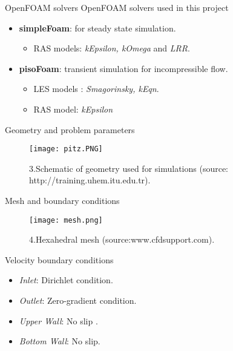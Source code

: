 \documentclass [xcolor=svgnames, t] {beamer}
\begin{document}
\begin{frame}{OpenFOAM solvers }
   OpenFOAM solvers used in this project
   \vspace{1cm}
   \begin{itemize}
       \item \textbf{simpleFoam\autocite{chapter6}}: for steady state simulation.
       \begin{itemize}
           \item RAS models: \textit{kEpsilon, kOmega} and \textit{LRR}.
       \end{itemize}
       \item \textbf{pisoFoam\autocite{chapter7}}:  transient simulation for incompressible flow.
       \begin{itemize}
          
           \item LES models : \textit{Smagorinsky,
          kEqn}.
          \item RAS model: \textit{kEpsilon}
     
       \end{itemize}
   \end{itemize}
   
\end{frame}

\begin{frame}{Geometry and problem parameters } 
   \begin{figure}
       \centering
       \texttt{[image: pitz.PNG]}
       \caption{3.Schematic of geometry used for simulations (source: http://training.uhem.itu.edu.tr). }
   \end{figure}
   
   
\end{frame}

\begin{frame}{ Mesh and boundary conditions}
   \begin{figure}
       \centering
       \texttt{[image: mesh.png]}
       \caption{4.Hexahedral mesh (source:www.cfdsupport.com).}
   \end{figure} 
   
  Velocity  boundary conditions
   \begin{itemize}
       \item \textit{Inlet}: Dirichlet
condition.
       \item \textit{Outlet}: Zero-gradient condition.
      \item  \textit{Upper Wall}: No slip .
       \item \textit{Bottom Wall}: No slip.
   \end{itemize}
   
\end{frame}
\end{document}
